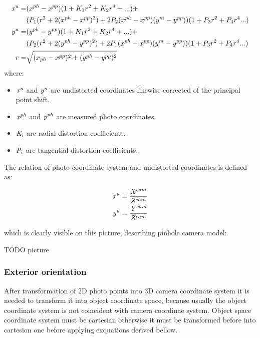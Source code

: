 \documentclass[a4paper,12pt]{article}
\newcommand{\escal}[1]{
{\it #1}
}
\begin{document}
\begin{equation}
\label{eq:undistort}
\begin{split}
\escal{x}^{u} =& (x^{ph} - x^{pp})(1 + K_{1}r^2 + K_2r^4 + ...) + \\
&(P_1(r^2 + 2(x^{ph} - x^{pp})^2) + 2P_2(x^{ph} - x^{pp})(y^{m} - y^{pp}))(1 + P_3r^2 + P_4r^4 ...) \\
\escal{y}^{u} =& (y^{ph} - y^{pp})(1 + K_1r^2 + K_2r^4 + ...) + \\
&(P_2(r^2 + 2(y^{ph} - y^{pp})^2) + 2P_1(x^{ph} - x^{pp})(y^{m} - y^{pp}))(1 + P_3r^2 + P_4r^4 ...) \\
r =& \sqrt{(x_{ph} - x^{pp})^2 + (y^{ph} - y^{pp})^2}
\end{split}
\end{equation}
where:
\begin{itemize}
  \item $\escal{x}^{u}$ and $\escal{y}^{u}$  are undistorted coordinates likewise corrected of the principal point shift.
  \item $\escal{x}^{ph}$ and $\escal{y}^{ph}$ are measured photo coordinates.
  \item $\escal{K}_{i}$ are radial distortion coefficients.
  \item $\escal{P}_{i}$ are tangential distortion coefficients.
\end{itemize}


The relation of photo coordinate system and undistorted coordinates is defined as:

\begin{equation}
\begin{split}
&\escal{x}^{u} = \frac{\escal{X}^{cam}}{\escal{Z}^{cam}} \\
&\escal{y}^{u} = \frac{\escal{Y}^{cam}}{\escal{Z}^{cam}}
\end{split}
\end{equation}

which is clearly visible on this picture, describing pinhole camera model:

TODO picture


\subsubsection{Exterior orientation}

After transformation of 2D photo points into 3D camera coordinate system it is needed to transform it into object coordinate space,
because usually the object coordinate system is not coincident with camera coordinae system. 
Object space coordinate system must be cartesian otherwise it must be transformed before into cartesion one before applying exquations 
derived bellow. 
\end{document}
